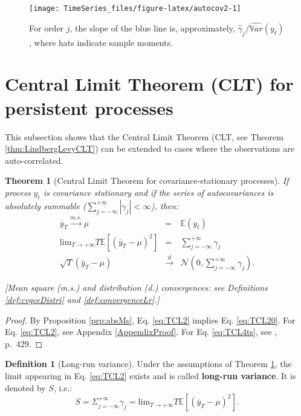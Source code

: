 \documentclass[
  12pt,
]{book}
\newtheorem{theorem}{Theorem}[chapter]
\theoremstyle{definition}
\newtheorem{definition}{Definition}[chapter]
\theoremstyle{definition}
\theoremstyle{definition}
\theoremstyle{definition}
\theoremstyle{remark}
\begin{document}
\begin{figure}
\texttt{[image: TimeSeries\_files/figure-latex/autocov2-1]} \caption{For order $j$, the slope of the blue line is, approximately, $\hat{\gamma}_j/\widehat{\mathbb{V}ar}(y_t)$, where hats indicate sample moments.}\label{fig:autocov2}
\end{figure}

\hypertarget{central-limit-theorem-clt-for-persistent-processes}{%
\section{Central Limit Theorem (CLT) for persistent processes}\label{central-limit-theorem-clt-for-persistent-processes}}

This subsection shows that the Central Limit Theorem (CLT, see Theorem \ref{thm:LindbergLevyCLT}) can be extended to cases where the observations are auto-correlated.

\begin{theorem}[Central Limit Theorem for covariance-stationary processes]
\protect\hypertarget{thm:CLTcovstat}{}\label{thm:CLTcovstat}If process \(y_t\) is covariance stationary and if the series of autocovariances is absolutely summable (\(\sum_{j=-\infty}^{+\infty} |\gamma_j| <\infty\)), then:
\begin{eqnarray}
\bar{y}_T \overset{m.s.}{\rightarrow} \mu &=& \mathbb{E}(y_t) \label{eq:TCL20}\\
\mbox{lim}_{T \rightarrow +\infty} T \mathbb{E}\left[(\bar{y}_T - \mu)^2\right] &=& \sum_{j=-\infty}^{+\infty} \gamma_j \label{eq:TCL2}\\
\sqrt{T}(\bar{y}_T - \mu) &\overset{d}{\rightarrow}& \mathcal{N}\left(0,\sum_{j=-\infty}^{+\infty} \gamma_j \right) \label{eq:TCL4ts}.
\end{eqnarray}

{[}Mean square (m.s.) and distribution (d.) convergences: see Definitions \ref{def:cvgceDistri} and \ref{def:convergenceLr}.{]}
\end{theorem}

\begin{proof}
By Proposition \ref{prp:absMs}, Eq. \eqref{eq:TCL2} implies Eq. \eqref{eq:TCL20}. For Eq. \eqref{eq:TCL2}, see Appendix \ref{AppendixProof}. For Eq. \eqref{eq:TCL4ts}, see \citet{Anderson_1971}, p.~429.
\end{proof}

\begin{definition}[Long-run variance]
\protect\hypertarget{def:LRV}{}\label{def:LRV}Under the assumptions of Theorem \ref{thm:CLTcovstat}, the limit appearing in Eq. \eqref{eq:TCL2} exists and is called \textbf{long-run variance}. It is denoted by \(S\), i.e.:
\[
S = \Sigma_{j=-\infty}^{+\infty} \gamma_j  = \mbox{lim}_{T \rightarrow +\infty} T \mathbb{E}[(\bar{y}_T - \mu)^2].
\]
\end{definition}
\end{document}
